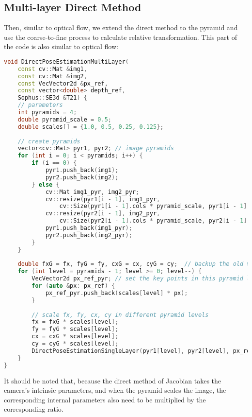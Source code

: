 \subsection{Multi-layer Direct Method}
Then, similar to optical flow, we extend the direct method to the pyramid and use the coarse-to-fine process to calculate relative transformation. This part of the code is also similar to optical flow:
\begin{lstlisting}[language=c++,caption=slambook2/ch8/direct_method.cpp (part)]
void DirectPoseEstimationMultiLayer(
	const cv::Mat &img1,
	const cv::Mat &img2,
	const VecVector2d &px_ref,
	const vector<double> depth_ref,
	Sophus::SE3d &T21) {
	// parameters
	int pyramids = 4;
	double pyramid_scale = 0.5;
	double scales[] = {1.0, 0.5, 0.25, 0.125};
	
	// create pyramids
	vector<cv::Mat> pyr1, pyr2; // image pyramids
	for (int i = 0; i < pyramids; i++) {
		if (i == 0) {
			pyr1.push_back(img1);
			pyr2.push_back(img2);
		} else {
			cv::Mat img1_pyr, img2_pyr;
			cv::resize(pyr1[i - 1], img1_pyr,
				cv::Size(pyr1[i - 1].cols * pyramid_scale, pyr1[i - 1].rows * pyramid_scale));
			cv::resize(pyr2[i - 1], img2_pyr,
				cv::Size(pyr2[i - 1].cols * pyramid_scale, pyr2[i - 1].rows * pyramid_scale));
			pyr1.push_back(img1_pyr);
			pyr2.push_back(img2_pyr);
		}
	}
	
	double fxG = fx, fyG = fy, cxG = cx, cyG = cy;  // backup the old values
	for (int level = pyramids - 1; level >= 0; level--) {
		VecVector2d px_ref_pyr; // set the key points in this pyramid level
		for (auto &px: px_ref) {
			px_ref_pyr.push_back(scales[level] * px);
		}
		
		// scale fx, fy, cx, cy in different pyramid levels
		fx = fxG * scales[level];
		fy = fyG * scales[level];
		cx = cxG * scales[level];
		cy = cyG * scales[level];
		DirectPoseEstimationSingleLayer(pyr1[level], pyr2[level], px_ref_pyr, depth_ref, T21);
	}	
}
\end{lstlisting}
It should be noted that, because the direct method of Jacobian takes the camera's intrinsic parameters, and when the pyramid scales the image, the corresponding internal parameters also need to be multiplied by the corresponding ratio.

